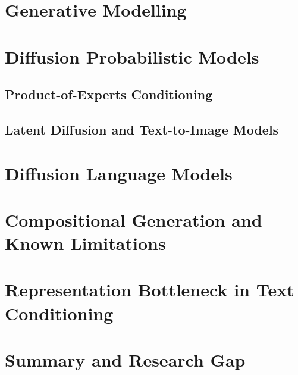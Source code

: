 \documentclass[a4paper,twoside,12pt]{report}
\begin{document}
\section{Generative Modelling}

\section{Diffusion Probabilistic Models}

\subsection{Product-of-Experts Conditioning}

\subsection{Latent Diffusion and Text-to-Image Models}

\section{Diffusion Language Models}

\section{Compositional Generation and Known Limitations}

\section{Representation Bottleneck in Text Conditioning}

\section{Summary and Research Gap}
\end{document}
